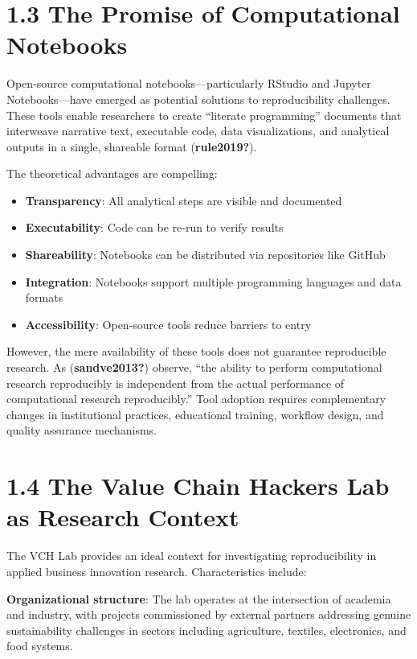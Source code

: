 \documentclass[
  oneside,
  open=any]{scrbook}
\providecommand{\tightlist}{%
  \setlength{\itemsep}{0pt}\setlength{\parskip}{0pt}}\usepackage{longtable,booktabs,array}
\begin{document}
\section{1.3 The Promise of Computational
Notebooks}\label{the-promise-of-computational-notebooks}

Open-source computational notebooks---particularly RStudio and Jupyter
Notebooks---have emerged as potential solutions to reproducibility
challenges. These tools enable researchers to create ``literate
programming'' documents that interweave narrative text, executable code,
data visualizations, and analytical outputs in a single, shareable
format (\textbf{rule2019?}).

The theoretical advantages are compelling:

\begin{itemize}
\tightlist
\item
  \textbf{Transparency}: All analytical steps are visible and documented
\item
  \textbf{Executability}: Code can be re-run to verify results
\item
  \textbf{Shareability}: Notebooks can be distributed via repositories
  like GitHub
\item
  \textbf{Integration}: Notebooks support multiple programming languages
  and data formats
\item
  \textbf{Accessibility}: Open-source tools reduce barriers to entry
\end{itemize}

However, the mere availability of these tools does not guarantee
reproducible research. As (\textbf{sandve2013?}) observe, ``the ability
to perform computational research reproducibly is independent from the
actual performance of computational research reproducibly.'' Tool
adoption requires complementary changes in institutional practices,
educational training, workflow design, and quality assurance mechanisms.

\section{1.4 The Value Chain Hackers Lab as Research
Context}\label{the-value-chain-hackers-lab-as-research-context}

The VCH Lab provides an ideal context for investigating reproducibility
in applied business innovation research. Characteristics include:

\textbf{Organizational structure}: The lab operates at the intersection
of academia and industry, with projects commissioned by external
partners addressing genuine sustainability challenges in sectors
including agriculture, textiles, electronics, and food systems.
\end{document}
